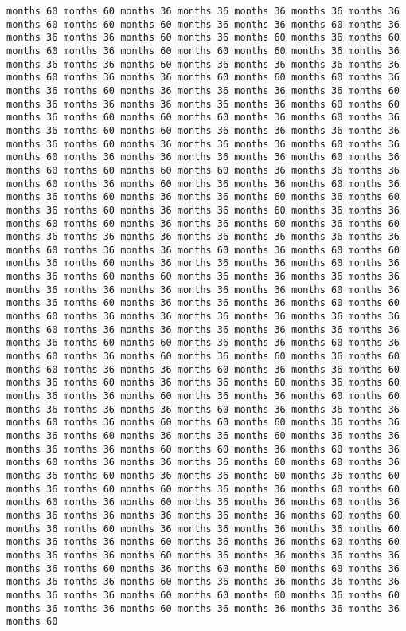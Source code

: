 \documentclass[11pt]{article}
\begin{document}
\begin{Verbatim}[commandchars=\\\{\}, frame=single, framerule=2mm, rulecolor=\color{outerrorbackground}]
months 60 months 60 months 36 months 36 months 36 months 36 months 36 months 60 months 60 months 60 months 36 months 36 months 60 months 36 months 36 months 36 months 60 months 36 months 60 months 36 months 60 months 60 months 36 months 60 months 60 months 60 months 36 months 36 months 36 months 36 months 60 months 36 months 36 months 36 months 36 months 60 months 36 months 36 months 60 months 60 months 60 months 36 months 36 months 60 months 36 months 36 months 36 months 36 months 60 months 36 months 36 months 36 months 36 months 36 months 60 months 60 months 36 months 60 months 60 months 60 months 36 months 60 months 36 months 36 months 60 months 60 months 36 months 36 months 36 months 36 months 36 months 60 months 36 months 36 months 36 months 60 months 36 months 60 months 36 months 36 months 36 months 36 months 60 months 36 months 60 months 60 months 60 months 60 months 36 months 36 months 36 months 60 months 36 months 60 months 36 months 36 months 60 months 36 months 36 months 60 months 36 months 36 months 60 months 36 months 60 months 36 months 60 months 36 months 36 months 60 months 36 months 36 months 60 months 60 months 36 months 36 months 60 months 36 months 60 months 36 months 36 months 36 months 36 months 36 months 36 months 36 months 60 months 36 months 36 months 60 months 36 months 60 months 60 months 36 months 60 months 36 months 36 months 36 months 60 months 36 months 36 months 60 months 60 months 36 months 36 months 36 months 36 months 36 months 36 months 36 months 36 months 36 months 60 months 36 months 36 months 60 months 36 months 36 months 36 months 60 months 60 months 60 months 36 months 36 months 36 months 36 months 36 months 36 months 60 months 36 months 36 months 36 months 36 months 36 months 36 months 36 months 60 months 60 months 36 months 36 months 60 months 36 months 60 months 36 months 60 months 36 months 60 months 36 months 60 months 60 months 36 months 36 months 60 months 36 months 36 months 60 months 36 months 60 months 36 months 36 months 60 months 36 months 60 months 36 months 36 months 60 months 36 months 36 months 60 months 60 months 36 months 36 months 36 months 60 months 36 months 36 months 36 months 60 months 36 months 60 months 60 months 60 months 36 months 36 months 36 months 60 months 36 months 36 months 60 months 36 months 36 months 36 months 36 months 60 months 60 months 36 months 60 months 36 months 60 months 36 months 36 months 36 months 60 months 60 months 36 months 36 months 60 months 36 months 36 months 60 months 36 months 60 months 36 months 60 months 60 months 36 months 36 months 60 months 60 months 60 months 36 months 60 months 36 months 36 months 60 months 36 months 36 months 36 months 36 months 36 months 36 months 60 months 60 months 36 months 60 months 36 months 36 months 36 months 36 months 60 months 36 months 36 months 60 months 36 months 36 months 60 months 60 months 36 months 36 months 60 months 36 months 36 months 36 months 36 months 36 months 60 months 36 months 60 months 60 months 60 months 36 months 36 months 36 months 60 months 36 months 36 months 36 months 36 months 36 months 36 months 60 months 60 months 60 months 36 months 60 months 36 months 36 months 60 months 36 months 36 months 36 months 36 months 60 
\end{Verbatim}
\end{document}
